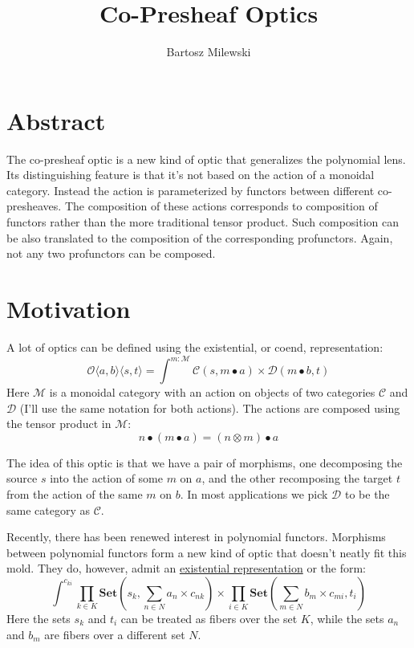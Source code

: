 \documentclass[11pt]{amsart}
\author{Bartosz Milewski}
\title{Co-Presheaf Optics}
\newcommand{\cat}[1]{\mathcal{#1}}%
\begin{document}
\maketitle{}

\section{Abstract}

The co-presheaf optic is a new kind of optic that generalizes the polynomial lens. Its distinguishing feature is that it's not based on the action of a monoidal category. Instead the action is parameterized by functors between different co-presheaves. The composition of these actions corresponds to composition of functors rather than the more traditional tensor product. Such composition can be also translated to the composition of the corresponding profunctors. Again, not any two profunctors can be composed. 

\section{Motivation}

A lot of optics can be defined using the existential, or coend, representation:
\[ \mathcal{O}\langle a, b\rangle \langle s, t \rangle = \int^{m \colon \cat M} \cat C (s, m \bullet a) \times \cat D ( m \bullet b, t) \]
Here $\cat M$ is a monoidal category with an action on objects of two categories $\cat C$ and $\cat D$ (I'll use the same notation for both actions). The actions are composed using the tensor product in $\cat M$:
\[ n \bullet (m \bullet a) = (n \otimes m) \bullet a \]

The idea of this optic is that we have a pair of morphisms, one decomposing the source $s$ into the action of some $m$ on $a$, and the other recomposing the target $t$ from the action of the same $m$ on $b$. In most applications we pick $\cat D$ to be the same category as $\cat C$.

Recently, there has been renewed interest in polynomial functors. Morphisms between polynomial functors form a new kind of optic that doesn't neatly fit this mold. They do, however, admit an \href{https://bartoszmilewski.com/2021/12/07/polylens/}{existential representation} or the form:
\[ \int^{c_{k i}} 
 \prod_{k \in K} \mathbf{Set} \left(s_k,  \sum_{n \in N} a_n \times c_{n k} \right) \times 
 \prod_{i \in K}  \mathbf{Set} \left(\sum_{m \in N} b_m \times c_{m i}, t_i \right) \]
Here the sets $s_k$ and $t_i$ can be treated as fibers over the set $K$, while the sets $a_n$ and $b_m$ are fibers over a different set $N$. 
\end{document}
